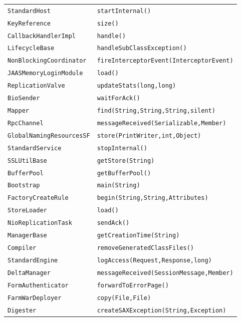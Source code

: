 \begin{center}
\begin{longtable}{ll}
 \lstinline/StandardHost/&{\lstinline/startInternal()/}\\
 \lstinline/KeyReference/&{\lstinline/size()/}\\
 \lstinline/CallbackHandlerImpl/&{\lstinline/handle()/}\\
 \lstinline/LifecycleBase/&{\lstinline/handleSubClassException()/}\\
 \lstinline/NonBlockingCoordinator/&{\lstinline/fireInterceptorEvent(InterceptorEvent)/}\\
 \lstinline/JAASMemoryLoginModule/&{\lstinline/load()/}\\
 \lstinline/ReplicationValve/&{\lstinline/updateStats(long,long)/}\\
 \lstinline/BioSender/&{\lstinline/waitForAck()/}\\
 \lstinline/Mapper/&{\lstinline/find(String,String,String,silent)/}\\
 \lstinline/RpcChannel/&{\lstinline/messageReceived(Serializable,Member)/}\\
 \lstinline/GlobalNamingResourcesSF/&{\lstinline/store(PrintWriter,int,Object)/}\\
 \lstinline/StandardService/&{\lstinline/stopInternal()/}\\
 \lstinline/SSLUtilBase/&{\lstinline/getStore(String)/}\\
 \lstinline/BufferPool/&{\lstinline/getBufferPool()/}\\
 \lstinline/Bootstrap/&{\lstinline/main(String)/}\\
 \lstinline/FactoryCreateRule/&{\lstinline/begin(String,String,Attributes)/}\\
 \lstinline/StoreLoader/&{\lstinline/load()/}\\
  \lstinline/NioReplicationTask/&{\lstinline/sendAck()/}\\
 \lstinline/ManagerBase/&{\lstinline/getCreationTime(String)/}\\
 \lstinline/Compiler/&{\lstinline/removeGeneratedClassFiles()/}\\
 \lstinline/StandardEngine/&{\lstinline/logAccess(Request,Response,long)/}\\
 \lstinline/DeltaManager/&{\lstinline/messageReceived(SessionMessage,Member)/}\\
 \lstinline/FormAuthenticator/&{\lstinline/forwardToErrorPage()/}\\
 \lstinline/FarmWarDeployer/&{\lstinline/copy(File,File)/}\\
 \lstinline/Digester/&{\lstinline/createSAXException(String,Exception)/}\\

\end{longtable}
\end{center}
